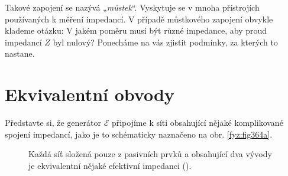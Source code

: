   Takové zapojení se nazývá „\emph{můstek}“. Vyskytuje se v mnoha přístrojích používaných k měření 
  impedancí. V případě můstkového zapojení obvykle klademe otázku: V jakém poměru musí být různé 
  impedance, aby proud impedancí \(Z\) byl nulový? Ponecháme na vás zjistit podmínky, za kterých to 
  nastane.

\section{Ekvivalentní obvody}\label{fyz:IIchapXXIIsecIV}
  Představte si, že generátor \(\mathscr{E}\) připojíme k síti obsahující nějaké komplikované 
  spojení impedancí, jako je to schématicky naznačeno na obr. \ref{fyz:fig364a}.
  
  \begin{figure}[hb!] %
    \centering
    \caption{Každá síť složená pouze z pasivních prvků a obsahující dva vývody je ekvivalentní 
             nějaké efektivní impedanci
             (\cite[s.~404]{Feynman02}).}
    \label{fyz:fig364}
  \end{figure}
  
